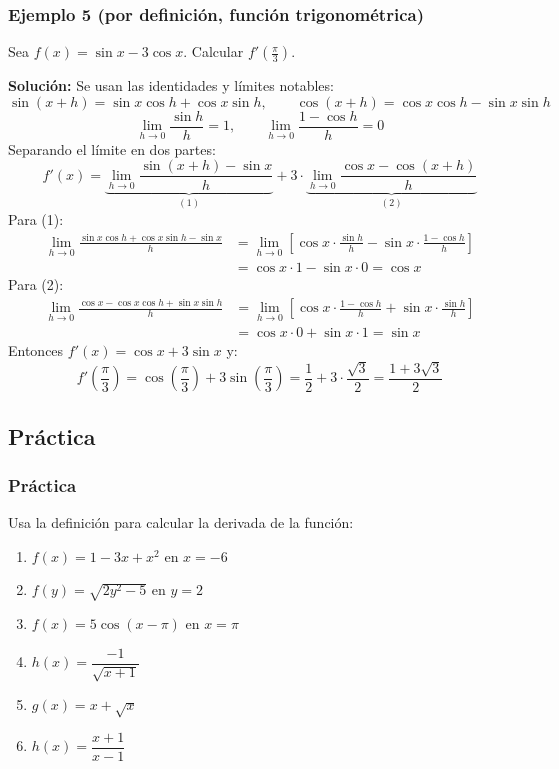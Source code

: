 \documentclass[12pt]{article}
\begin{document}
\subsubsection{Ejemplo 5 (por definición, función trigonométrica)}


Sea $f(x) = \sin x - 3\cos x$. Calcular $f'\left(\frac{\pi}{3}\right)$.

\textbf{Solución:} Se usan las identidades y límites notables:
\[
\sin(x + h) = \sin x \cos h + \cos x \sin h, \qquad \cos(x + h) = \cos x \cos h - \sin x \sin h
\]
\[
\lim_{h \to 0} \frac{\sin h}{h} = 1, \qquad \lim_{h \to 0} \frac{1 - \cos h}{h} = 0
\]
Separando el límite en dos partes:
\[
f'(x) = \underbrace{\lim_{h \to 0} \frac{\sin(x + h) - \sin x}{h}}_{(1)} + 3 \cdot \underbrace{\lim_{h \to 0} \frac{\cos x - \cos(x + h)}{h}}_{(2)}
\]
Para (1):
\begin{align*}
\lim_{h \to 0} \frac{\sin x \cos h + \cos x \sin h - \sin x}{h} &= \lim_{h \to 0} \left[ \cos x \cdot \frac{\sin h}{h} - \sin x \cdot \frac{1 - \cos h}{h} \right] \\
&= \cos x \cdot 1 - \sin x \cdot 0 = \cos x
\end{align*}
Para (2):
\begin{align*}
\lim_{h \to 0} \frac{\cos x - \cos x \cos h + \sin x \sin h}{h} &= \lim_{h \to 0} \left[ \cos x \cdot \frac{1 - \cos h}{h} + \sin x \cdot \frac{\sin h}{h} \right] \\
&= \cos x \cdot 0 + \sin x \cdot 1 = \sin x
\end{align*}
Entonces $f'(x) = \cos x + 3\sin x$ y:
\[
f'\left(\frac{\pi}{3}\right) = \cos\left(\frac{\pi}{3}\right) + 3\sin\left(\frac{\pi}{3}\right) = \frac{1}{2} + 3 \cdot \frac{\sqrt{3}}{2} = \frac{1 + 3\sqrt{3}}{2}
\]



\subsection{Práctica}

\subsubsection{Práctica}


Usa la definición para calcular la derivada de la función:
\begin{enumerate}
    \item $f(x) = 1 - 3x + x^2$ en $x = -6$
    \item $f(y) = \sqrt{2y^2 - 5}$ en $y = 2$
    \item $f(x) = 5\cos(x - \pi)$ en $x = \pi$
    \item $h(x) = \dfrac{-1}{\sqrt{x + 1}}$
    \item $g(x) = x + \sqrt{x}$
    \item $h(x) = \dfrac{x + 1}{x - 1}$
\end{enumerate}
\end{document}
